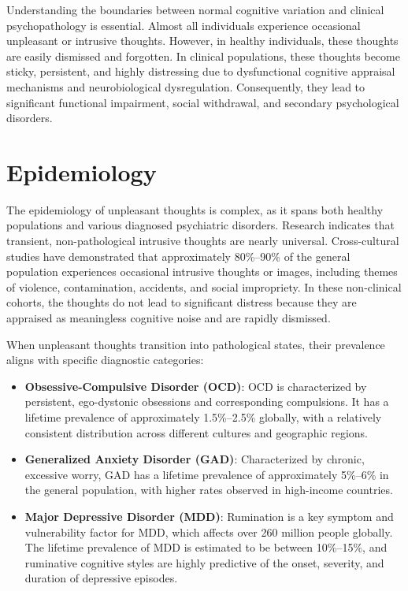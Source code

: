Understanding the boundaries between normal cognitive variation and clinical psychopathology is essential. Almost all individuals experience occasional unpleasant or intrusive thoughts. However, in healthy individuals, these thoughts are easily dismissed and forgotten. In clinical populations, these thoughts become sticky, persistent, and highly distressing due to dysfunctional cognitive appraisal mechanisms and neurobiological dysregulation. Consequently, they lead to significant functional impairment, social withdrawal, and secondary psychological disorders.

\section*{Epidemiology}
The epidemiology of unpleasant thoughts is complex, as it spans both healthy populations and various diagnosed psychiatric disorders. Research indicates that transient, non-pathological intrusive thoughts are nearly universal. Cross-cultural studies have demonstrated that approximately 80\%--90\% of the general population experiences occasional intrusive thoughts or images, including themes of violence, contamination, accidents, and social impropriety. In these non-clinical cohorts, the thoughts do not lead to significant distress because they are appraised as meaningless cognitive noise and are rapidly dismissed.

When unpleasant thoughts transition into pathological states, their prevalence aligns with specific diagnostic categories:
\begin{itemize}
  \item \textbf{Obsessive-Compulsive Disorder (OCD)}: OCD is characterized by persistent, ego-dystonic obsessions and corresponding compulsions. It has a lifetime prevalence of approximately 1.5\%--2.5\% globally, with a relatively consistent distribution across different cultures and geographic regions.
  \item \textbf{Generalized Anxiety Disorder (GAD)}: Characterized by chronic, excessive worry, GAD has a lifetime prevalence of approximately 5\%--6\% in the general population, with higher rates observed in high-income countries.
  \item \textbf{Major Depressive Disorder (MDD)}: Rumination is a key symptom and vulnerability factor for MDD, which affects over 260 million people globally. The lifetime prevalence of MDD is estimated to be between 10\%--15\%, and ruminative cognitive styles are highly predictive of the onset, severity, and duration of depressive episodes.
\end{itemize}

